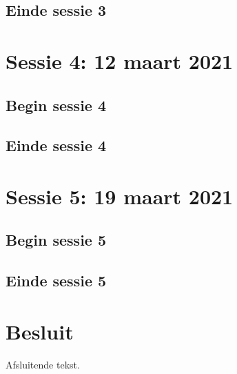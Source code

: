 \documentclass[a4paper,twoside,kulak]{kulakreport} %
\begin{document}
\section{Einde sessie 3}


\chapter{Sessie 4: 12 maart 2021}
\section{Begin sessie 4}

\section{Einde sessie 4}


\chapter{Sessie 5: 19 maart 2021}
\section{Begin sessie 5}

\section{Einde sessie 5}











\chapter*{Besluit}
Afsluitende tekst.
\end{document}
